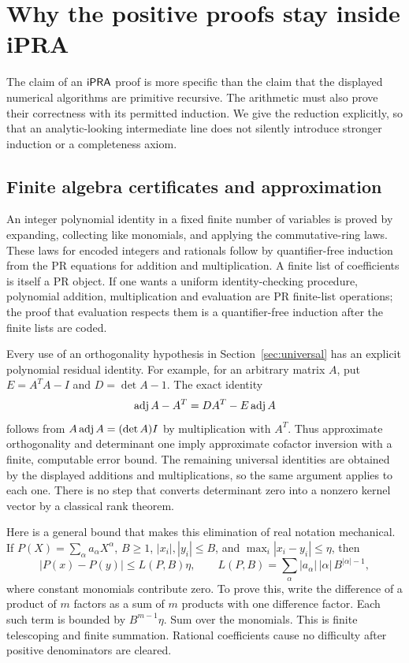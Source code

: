 \section{Why the positive proofs stay inside iPRA}\label{sec:proof-audit}

The claim of an $\mathsf{iPRA}$ proof is more specific than the claim that the
displayed numerical algorithms are primitive recursive. The arithmetic
must also prove their correctness with its permitted induction. We give
the reduction explicitly, so that an analytic-looking intermediate line
does not silently introduce stronger induction or a completeness axiom.

\subsection{Finite algebra certificates and approximation}
An integer polynomial identity in a fixed finite number of variables is
proved by expanding, collecting like monomials, and applying the
commutative-ring laws. These laws for encoded integers and rationals
follow by quantifier-free induction from the PR equations for addition
and multiplication. A finite list of coefficients is itself a PR object.
If one wants a uniform identity-checking procedure, polynomial addition,
multiplication and evaluation are PR finite-list operations; the proof
that evaluation respects them is a quantifier-free induction after the
finite lists are coded.

Every use of an orthogonality hypothesis in
Section~\ref{sec:universal} has an explicit polynomial residual identity.
For example, for an arbitrary matrix $A$, put
$E=A^TA-I$ and $D=\det A-1$. The exact identity
\begin{equation}\label{eq:adj-residual}
 \operatorname{adj} A-A^T=D A^T-E\operatorname{adj} A
\end{equation}
follows from $A\operatorname{adj} A=(\det A)I$ by multiplication with $A^T$.
Thus approximate orthogonality and determinant one imply approximate
cofactor inversion with a finite, computable error bound. The remaining
universal identities are obtained by the displayed additions and
multiplications, so the same argument applies to each one. There is no
step that converts determinant zero into a nonzero kernel vector by a
classical rank theorem.

Here is a general bound that makes this elimination of real notation
mechanical. If $P(X)=\sum_\alpha a_\alpha X^\alpha$, $B\ge1$,
$|x_i|,|y_i|\le B$, and $\max_i|x_i-y_i|\le\eta$, then
\begin{equation}\label{eq:poly-lipschitz}
 |P(x)-P(y)|\le L(P,B)\eta,\qquad
 L(P,B)=\sum_\alpha |a_\alpha|\,|\alpha|\,B^{|\alpha|-1},
\end{equation}
where constant monomials contribute zero. To prove this, write the
difference of a product of $m$ factors as a sum of $m$ products with one
difference factor. Each such term is bounded by $B^{m-1}\eta$.
Sum over the monomials. This is finite telescoping and finite summation.
Rational coefficients cause no difficulty after positive denominators
are cleared.

